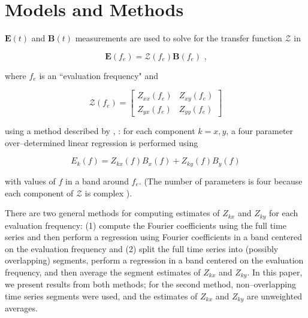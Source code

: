 \documentclass[draft,linenumbers]{agujournal2018}
\newcommand{\citeay}[1]{%
\citeauthor{#1}, \citeyear{#1}%
}
\begin{document}
\section{Models and Methods}
\label{section:Models_and_Methods}

$\mathbf{E}(t)$ and $\mathbf{B}(t)$ measurements are used to solve for the transfer function $\boldsymbol{\mathcal{Z}}$ in

\begin{linenomath*}
    \begin{equation}
        \mathbf{E}(f_e) = \boldsymbol{\mathcal{
    Z}}(f_e)\mathbf{B}(f_e)\text{ ,}
    \end{equation}
\end{linenomath*}

\noindent where $f_e$ is an ``evaluation frequency" and
    
\begin{linenomath*}
    \begin{equation}
        \boldsymbol{\mathcal{Z}}(f_e) = 
            \begin{bmatrix}
                Z_{xx}(f_e) & Z_{xy}(f_e)\\
                Z_{yx}(f_e) & Z_{yy}(f_e)
            \end{bmatrix}
    \end{equation}
\end{linenomath*}

\noindent using a method described by \citeay{Sims1971}: for each component $k=x,y$, a four parameter over--determined linear regression is performed using

\begin{equation}
E_k(f) = Z_{kx}(f)B_x(f) + Z_{ky}(f)B_y(f)
\end{equation}

\noindent with values of $f$ in a band around $f_e$. (The number of parameters is four because each component of $\boldsymbol{\mathcal{Z}}$ is complex \citep{Egbert1986}).

There are two general methods for computing estimates of $Z_{kx}$ and $Z_{ky}$ for each evaluation frequency: (1) compute the Fourier coefficients using the full time series and then perform a regression using Fourier coefficients in a band centered on the evaluation frequency and (2) split the full time series into (possibly overlapping) segments, perform a regression in a band centered on the evaluation frequency, and then average the segment estimates of $Z_{kx}$ and $Z_{ky}$. In this paper, we present results from both methods; for the second method, non--overlapping time series segments were used, and the estimates of $Z_{kx}$ and $Z_{ky}$ are unweighted averages. 
\end{document}
